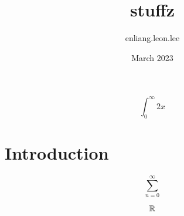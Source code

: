 \documentclass{article}
\title{stuffz}
\author{enliang.leon.lee }
\date{March 2023}
\begin{document}
\maketitle
$$\int_{0}^{\infty} 2x$$
\section{Introduction}

$$\sum_{n=0}^{\infty} $$

$$\mathbb{R}$$
\end{document}
